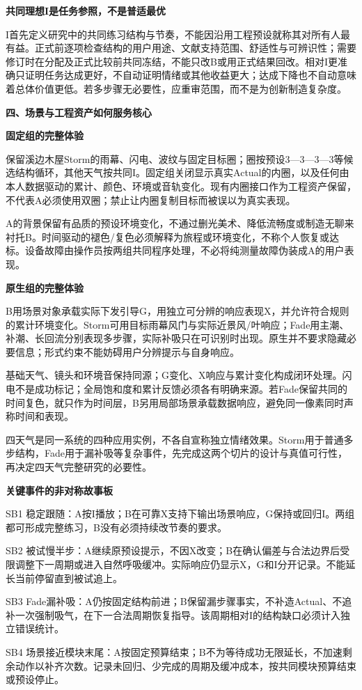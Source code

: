 \documentclass[11pt,a4paper]{article}
\newcommand{\reviewsection}[1]{\par\Needspace{9\baselineskip}\vspace{10pt}\begin{center}{\titlelatin\titlecjk\bfseries\fontsize{14}{20}\selectfont #1}\end{center}}
\newcommand{\reviewsubsection}[1]{\par\Needspace{4\baselineskip}\vspace{4pt}\begin{center}{\titlelatin\titlecjk\bfseries\fontsize{12}{18}\selectfont #1}\end{center}}
\begin{document}
\reviewsubsection{3.5 共同理想I是任务参照，不是普适最优}
I首先定义研究中的共同练习结构与节奏，不能因沿用工程预设就称其对所有人最有益。正式前逐项检查结构的用户用途、文献支持范围、舒适性与可辨识性；需要修订时在分配及正式比较前共同冻结，不能只改B或用正式结果回改。相对I更准确只证明任务达成更好，不自动证明情绪或其他收益更大；达成下降也不自动意味着总体价值更低。若多步骤无必要性，应重审范围，而不是为创新制造复杂度。

\reviewsection{四、场景与工程资产如何服务核心}
\reviewsubsection{4.1 固定组的完整体验}
保留溪边木屋Storm的雨幕、闪电、波纹与固定目标圈；圈按预设3—3—3—3等候选结构循环，其他天气按共同I。固定组关闭显示真实Actual的内圈，以及任何由本人数据驱动的累计、颜色、环境或音轨变化。现有内圈接口作为工程资产保留，不代表A必须使用双圈；禁止让内圈复制目标而被误以为真实表现。


A的背景保留有品质的预设环境变化，不通过删光美术、降低流畅度或制造无聊来衬托B。时间驱动的褪色/\allowbreak{}复色必须解释为旅程或环境变化，不称个人恢复或达标。设备故障由操作员按两组共同程序处理，不必将纯测量故障伪装成A的用户表现。


\reviewsubsection{4.2 原生组的完整体验}
B用场景对象承载实际下发引导G，用独立可分辨的响应表现X，并允许符合规则的累计环境变化。Storm可用目标雨幕风门与实际近景风/\allowbreak{}叶响应；Fade用主潮、补潮、长回流分别表现多步骤，实际补吸只在可识别时出现。原生并不要求隐藏必要信息；形式约束不能妨碍用户分辨提示与自身响应。


基础天气、镜头和环境音保持同源；G变化、X响应与累计变化构成闭环处理。闪电不是成功标记；全局饱和度和累计反馈必须各有明确来源。若Fade保留共同的时间复色，就只作为时间层，B另用局部场景承载数据响应，避免同一像素同时声称时间和表现。


四天气是同一系统的四种应用实例，不各自宣称独立情绪效果。Storm用于普通多步结构，Fade用于漏补吸等复杂事件，先完成这两个切片的设计与真值可行性，再决定四天气完整研究的必要性。


\reviewsubsection{4.3 关键事件的非对称故事板}
SB1 稳定跟随：A按I播放；B在可靠X支持下输出场景响应，G保持或回归I。两组都可形成完整练习，B没有必须持续改节奏的要求。


SB2 被试慢半步：A继续原预设提示，不因X改变；B在确认偏差与合法边界后受限调整下一周期或进入自然呼吸缓冲。实际响应仍显示X，G和I分开记录。不能延长当前停留直到被试追上。


SB3 Fade漏补吸：A仍按固定结构前进；B保留漏步骤事实，不补造Actual、不追补一次强制吸气，在下一合法周期恢复指导。该周期相对I的结构缺口必须计入独立错误统计。


SB4 场景接近模块末尾：A按固定预算结束；B不为等待成功无限延长，不加速剩余动作以补齐次数。记录未回归、少完成的周期及缓冲成本，按共同模块预算结束或预设停止。
\end{document}
